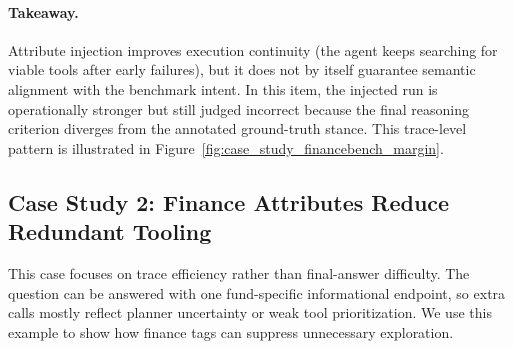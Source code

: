 \paragraph{Takeaway.}
Attribute injection improves execution continuity (the agent keeps searching for viable tools after early failures),
but it does not by itself guarantee semantic alignment with the benchmark intent.
In this item, the injected run is operationally stronger but still judged incorrect because
the final reasoning criterion diverges from the annotated ground-truth stance.
This trace-level pattern is illustrated in Figure~\ref{fig:case_study_financebench_margin}.

\subsection{Case Study 2: Finance Attributes Reduce Redundant Tooling}
\label{sec:case_study_openfindata_fund}

This case focuses on trace efficiency rather than final-answer difficulty.
The question can be answered with one fund-specific informational endpoint,
so extra calls mostly reflect planner uncertainty or weak tool prioritization.
We use this example to show how finance tags can suppress unnecessary exploration.

